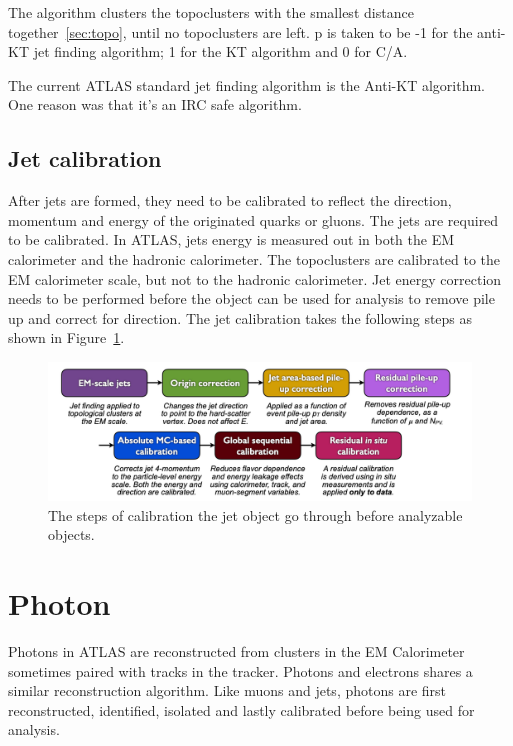The algorithm clusters the topoclusters with the smallest distance together~\ref{sec:topo}, until no topoclusters are left. p is taken to be -1 for the anti-KT jet finding algorithm; 1 for the KT algorithm and 0 for C/A. 

The current ATLAS standard jet finding algorithm is the Anti-KT algorithm. One reason was that it's an IRC safe algorithm.

\subsection{Jet calibration}
After jets are formed, they need to be calibrated to reflect the direction, momentum and energy of the originated quarks or gluons. The jets are required to be calibrated. In ATLAS, jets energy is measured out in both the EM calorimeter and the hadronic calorimeter. The topoclusters are calibrated to the EM calorimeter scale, but not to the hadronic calorimeter. Jet energy correction needs to be performed before the object can be used for analysis to remove pile up and correct for direction. The jet calibration takes the following steps as
shown in Figure~\ref{fig:JetCalibration}.

\begin{figure}[!htb]
    \begin{center}
        \includegraphics[width=1.1\textwidth]{figures/common_ana/JetCalibration}
        \caption{        
            The steps of calibration the jet object go through before analyzable objects\cite{Mehlhase:2770815}.
        }
        \label{fig:JetCalibration}
    \end{center}
\end{figure}

\section{Photon}
\label{sec:Photon}
Photons in ATLAS are reconstructed from clusters in the EM Calorimeter sometimes paired with tracks in the tracker. Photons and electrons shares a similar reconstruction algorithm. Like muons and jets, photons are first reconstructed, identified, isolated and lastly calibrated before being used for analysis. 

